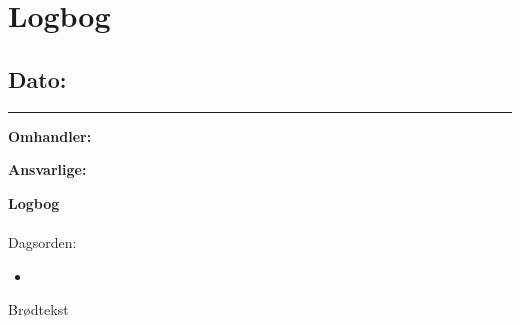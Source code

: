 \chapter{Logbog}

\section{Dato: }
\hrule

\textbf{Omhandler:} 

\textbf{Ansvarlige:} 

\textbf{Logbog}
\\
\\
Dagsorden:
\begin{itemize}
	\item 
\end{itemize}

Brødtekst 
